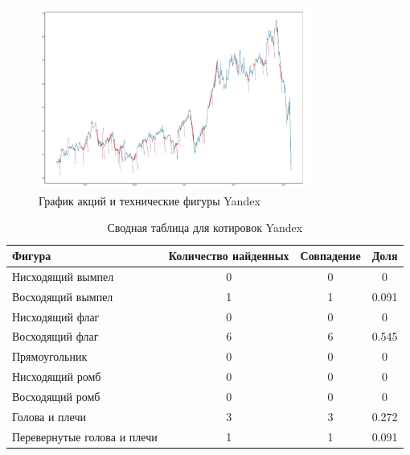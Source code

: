 \documentclass[bachelor, och, coursework]{SCWorks}
\begin{document}
    \begin{figure}[H]
        \centering
        \includegraphics[width=0.8\textwidth]{pic/Yandex.jpg}
        \caption{График акций и технические фигуры Yandex}
    \end{figure}
   
    \begin{table}[!hbt]
        \centering
        \begin{tabular}{|l|c|c|c|}
        \hline
        Фигура                      & \multicolumn{1}{l|}{Количество найденных} & Совпадение & Доля  \\ \hline
        Нисходящий вымпел           & 0                                         & 0          & 0     \\ \hline
        Восходящий вымпел           & 1                                         & 1          & 0.091 \\ \hline
        Нисходящий флаг             & 0                                         & 0          & 0     \\ \hline
        Восходящий флаг             & 6                                         & 6          & 0.545 \\ \hline
        Прямоугольник               & 0                                         & 0          & 0     \\ \hline
        Нисходящий ромб             & 0                                         & 0          & 0     \\ \hline
        Восходящий ромб             & 0                                         & 0          & 0     \\ \hline
        Голова и плечи              & 3                                         & 3          & 0.272 \\ \hline
        Перевернутые голова и плечи & 1                                         & 1          & 0.091 \\ \hline
        \end{tabular}
        \captionsetup{justification=centering}
        \caption{Сводная таблица для котировок Yandex}     
    \end{table}
\end{document}
